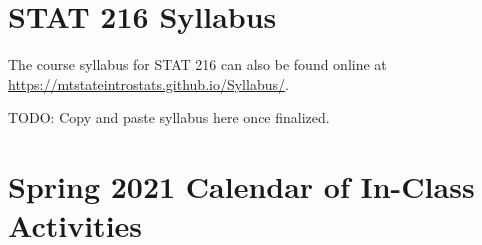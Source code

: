 \documentclass[
]{report}
\begin{document}
\hypertarget{stat-216-syllabus}{%
\chapter*{STAT 216 Syllabus}\label{stat-216-syllabus}}

The course syllabus for STAT 216 can also be found online at \url{https://mtstateintrostats.github.io/Syllabus/}.

TODO: Copy and paste syllabus here once finalized.

\hypertarget{spring-2021-calendar-of-in-class-activities}{%
\chapter*{Spring 2021 Calendar of In-Class Activities}\label{spring-2021-calendar-of-in-class-activities}}
\end{document}
